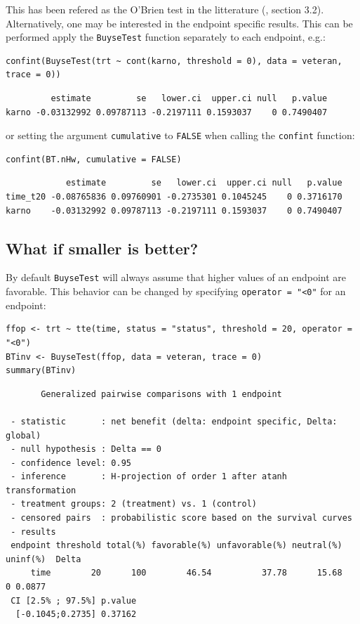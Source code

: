 \documentclass[12pt]{article}
\begin{document}
This has been refered as the O’Brien test in the litterature
(\cite{verbeeck2019generalized}, section 3.2). Alternatively, one may be
interested in the endpoint specific results. This can be performed
apply the \texttt{BuyseTest} function separately to each endpoint, e.g.:
\lstset{language=r,label= ,caption= ,captionpos=b,numbers=none}
\begin{lstlisting}
confint(BuyseTest(trt ~ cont(karno, threshold = 0), data = veteran, trace = 0))
\end{lstlisting}

\begin{verbatim}
         estimate         se   lower.ci  upper.ci null   p.value
karno -0.03132992 0.09787113 -0.2197111 0.1593037    0 0.7490407
\end{verbatim}


or setting the argument \texttt{cumulative} to \texttt{FALSE} when calling the
\texttt{confint} function:
\lstset{language=r,label= ,caption= ,captionpos=b,numbers=none}
\begin{lstlisting}
confint(BT.nHw, cumulative = FALSE)
\end{lstlisting}

\begin{verbatim}
            estimate         se   lower.ci  upper.ci null   p.value
time_t20 -0.08765836 0.09760901 -0.2735301 0.1045245    0 0.3716170
karno    -0.03132992 0.09787113 -0.2197111 0.1593037    0 0.7490407
\end{verbatim}


\clearpage

\subsection{What if smaller is better?}
\label{sec:orge8aec06}
By default \texttt{BuyseTest} will always assume that higher values of an
endpoint are favorable. This behavior can be changed by specifying \texttt{operator = "<0"}
for an endpoint:
\lstset{language=r,label= ,caption= ,captionpos=b,numbers=none}
\begin{lstlisting}
ffop <- trt ~ tte(time, status = "status", threshold = 20, operator = "<0")
BTinv <- BuyseTest(ffop, data = veteran, trace = 0)
summary(BTinv)
\end{lstlisting}

\begin{verbatim}
       Generalized pairwise comparisons with 1 endpoint

 - statistic       : net benefit (delta: endpoint specific, Delta: global) 
 - null hypothesis : Delta == 0 
 - confidence level: 0.95 
 - inference       : H-projection of order 1 after atanh transformation 
 - treatment groups: 2 (treatment) vs. 1 (control) 
 - censored pairs  : probabilistic score based on the survival curves
 - results
 endpoint threshold total(%) favorable(%) unfavorable(%) neutral(%) uninf(%)  Delta
     time        20      100        46.54          37.78      15.68        0 0.0877
 CI [2.5% ; 97.5%] p.value 
  [-0.1045;0.2735] 0.37162
\end{verbatim}
\end{document}
